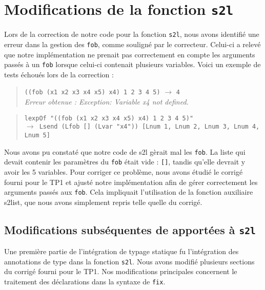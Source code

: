 \documentclass{article}
\begin{document}
\section{ Modifications de la fonction \texttt{s2l}}
\begin{justify}
Lors de la correction de notre code pour la fonction \texttt{s2l}, nous avons identifié une erreur dans la gestion des \texttt{fob}, comme souligné par le correcteur. Celui-ci a relevé que notre implémentation ne prenait pas correctement en compte les arguments passés à un \texttt{fob} lorsque celui-ci contenait plusieurs variables. Voici un exemple de tests échoués lors de la correction :
\end{justify}

\begin{quote}
\texttt{((fob (x1 x2 x3 x4 x5) x4) 1 2 3 4 5)} $\rightarrow$ \texttt{4} \\
\textit{ Erreur obtenue : Exception: Variable x4 not defined.}
\end{quote}

\begin{quote}
\texttt{lexpOf "((fob (x1 x2 x3 x4 x5) x4) 1 2 3 4 5)"} \\
\texttt{$\rightarrow$ Lsend (Lfob [] (Lvar "x4")) [Lnum 1, Lnum 2, Lnum 3, Lnum 4, Lnum 5]}
\end{quote}

\begin{justify}
Nous avons pu constaté que notre code de s2l gèrait mal les \texttt{fob}. La liste qui devait contenir les paramètres du \texttt{fob} était vide : \texttt{[]}, tandis qu'elle devrait y avoir les 5 variables. Pour corriger ce problème, nous avons étudié le corrigé fourni pour le TP1 et ajusté notre implémentation afin de gérer correctement les arguments passés aux \texttt{fob}. Cela impliquait l'utilisation de la fonction auxiliaire s2list, que nous avons simplement repris telle quelle du corrigé. 
\end{justify}

\subsection{Modifications subséquentes de apportées à \texttt{s2l}}
Une première partie de l'intégration de typage statique fu l'intégration des annotations de type dans la fonction \texttt{s2l}. Nous avons modifié plusieurs sections du corrigé fourni pour le TP1. Nos modifications principales concernent le traitement des déclarations dans la syntaxe de \texttt{fix}. 
\end{document}
